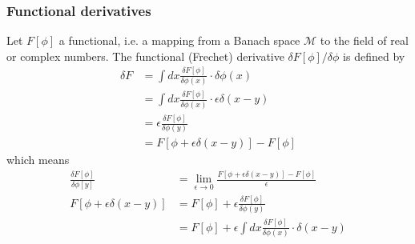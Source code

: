 \documentclass[10pt,a4paper]{article}
\theoremstyle{definition}
\begin{document}
\subsubsection{Functional derivatives}
Let $F[\phi]$ a functional, i.e. a mapping from a Banach space $\mathcal{M}$ to the field of real or complex numbers. The functional (Frechet) derivative $\delta F[\phi]/\delta\phi$ is defined by
\begin{align}
    \delta F
    &=\int dx \frac{\delta F[\phi]}{\delta\phi(x)}\cdot\delta\phi(x)\\
    &=\int dx \frac{\delta F[\phi]}{\delta\phi(x)}\cdot\epsilon\delta(x-y)\\
    &=\epsilon\frac{\delta F[\phi]}{\delta\phi(y)}\\
    &=F[\phi+\epsilon\delta(x-y)]-F[\phi]
\end{align}
which means
\begin{align}
    \frac{\delta F[\phi]}{\delta\phi[y]}&=\lim_{\epsilon\rightarrow0}\frac{F[\phi+\epsilon\delta(x-y)]-F[\phi]}{\epsilon}\\
    F[\phi+\epsilon\delta(x-y)]&=F[\phi]+\epsilon\frac{\delta F[\phi]}{\delta\phi(y)}\\
    &=F[\phi]+\epsilon\int dx \frac{\delta F[\phi]}{\delta\phi(x)}\cdot\delta(x-y)
\end{align}
\end{document}

